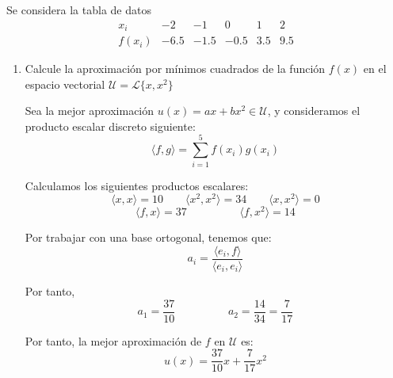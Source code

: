 \documentclass[12pt]{article}
\begin{document}
\begin{ejercicio}
    Se considera la tabla de datos
    \begin{equation*}
        \begin{array}{c|c|c|c|c|c}
            x_i & -2 & -1 & 0 & 1 & 2 \\ \hline
            f(x_i) & -6.5 & -1.5 & -0.5 & 3.5 & 9.5
        \end{array}
    \end{equation*}
    \begin{enumerate}
        \item Calcule la aproximación por mínimos cuadrados de la función $f(x)$ en el espacio vectorial $\mathcal{U}=\mathcal{L}\{x,x^2\}$

        Sea la mejor aproximación $u(x)=ax + bx^2\in \mathcal{U}$, y consideramos el producto escalar discreto siguiente:
        \begin{equation*}
            \langle f,g\rangle = \sum_{i=1}^5 f(x_i)g(x_i)
        \end{equation*}

        Calculamos los siguientes productos escalares:
        \begin{equation*}
            \langle x,x\rangle = 10 \qquad \langle x^2, x^2\rangle = 34 \qquad \langle x,x^2\rangle = 0
        \end{equation*}
        \begin{equation*}
            \langle f,x\rangle = 37 \hspace{2cm} \langle f, x^2\rangle = 14
        \end{equation*}

        Por trabajar con una base ortogonal, tenemos que:
        \begin{equation*}
            a_i = \frac{\langle e_i, f\rangle}{\langle e_i, e_i \rangle}
        \end{equation*}

        Por tanto,
        \begin{equation*}
            a_1 = \frac{37}{10} \hspace{2cm} a_2 = \frac{14}{34} = \frac{7}{17}
        \end{equation*}

        Por tanto, la mejor aproximación de $f$ en $\mathcal{U}$ es:
        \begin{equation*}
            u(x) = \frac{37}{10}x + \frac{7}{17}x^2
        \end{equation*}
        


\end{enumerate}
\end{ejercicio}
\end{document}

